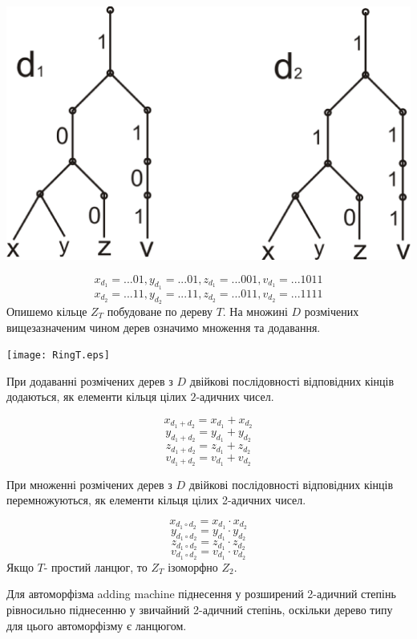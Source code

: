 \documentclass[a4paper,12pt]{article} \usepackage{a4wide}
\numberwithin{equation}{subsection}
\begin{document}
\begin{center}
\includegraphics[scale=0.4]{ElRing.eps}
\end{center}

$$x_{d_1}=...01, y_{d_1}=...01 , z_{d_1}=...001, v_{d_1}=...1011$$
 $$x_{d_2}=...11, y_{d_2}=...11 , z_{d_2}=...011, v_{d_2}=...1111$$
Опишемо кільце $Z_T$ побудоване по дереву $T$. На множині $D$ розмічених вищезазначеним чином дерев
означимо множення та додавання.
\begin{center}
\texttt{[image: RingT.eps]}
\end{center}
При додаванні розмічених дерев з $D$ двійкові послідовності відповідних кінців додаються,
 як елементи кільця цілих $2$-адичних чисел.


$$x_{d_1+d_2}=x_{d_1}+x_{d_2}$$
$$ y_{d_1+d_2}=y_{d_1}+y_{d_2}$$
$$z_{d_1+d_2}=z_{d_1}+z_{d_2}$$
$$ v_{d_1+d_2}=v_{d_1}+v_{d_2}$$

  При множенні розмічених дерев з $D$ двійкові послідовності відповідних кінців перемножуються,
 як елементи кільця цілих 2-адичних чисел.


$$x_{d_1\circ d_2}=x_{d_1}\cdot x_{d_2}$$ $$ y_{d_1\circ d_2}=y_{d_1}\cdot y_{d_2}$$
 $$z_{d_1\circ d_2}=z_{d_1}\cdot z_{d_2}$$ $$ v_{d_1\circ d_2}=v_{d_1}\cdot v_{d_2}$$
Якщо $T$- простий ланцюг, то $Z_T$ ізоморфно $Z_2$.

  Для автоморфізма adding machine піднесення у розширений 2-адичний степінь рівносильно піднесенню у звичайний 2-адичний
 степінь, оскільки дерево типу для цього автоморфізму є ланцюгом.
\end{document}

